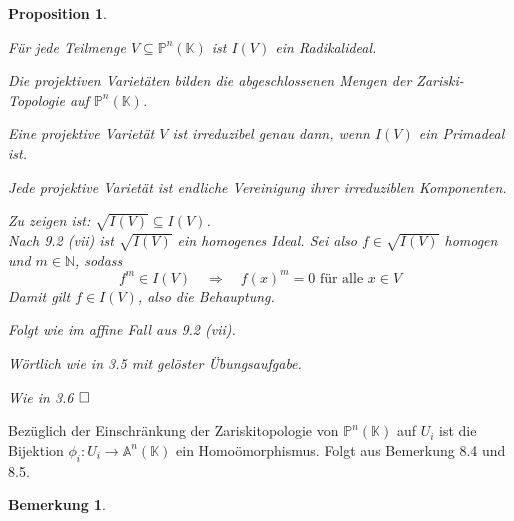 \documentclass[11pt]{book}
\newtheorem{prop}[theorem]{Proposition}
\newtheorem{remark}[theorem]{Bemerkung}
\theoremstyle{nonumberbreak}
\newenvironment{pr}[1][]{\ifthenelse{\equal{#1}{}}{\proof}{\proof[#1]}\rm}{\endproof}
\newenvironment{folg}[1][]{\ifthenelse{\equal{#1}{}}{\folger}{\folger[#1]}\rm}{\endfolger}
\begin{document}
\begin{spacing}{1.3}
\begin{prop} %
\begin{compactenum}
\item Für jede Teilmenge $V \subseteq \mathbb{P}^n(\mathbb{K})$ ist $I(V)$ ein Radikalideal.
\item Die projektiven Varietäten bilden die abgeschlossenen Mengen der \textit{Zariski-Topologie} auf $\mathbb{P}^n(\mathbb{K})$.
\item Eine projektive Varietät $V$ ist irreduzibel genau dann, wenn $I(V)$ ein Primadeal ist.
\item Jede projektive Varietät ist endliche Vereinigung ihrer irreduziblen Komponenten.
\end{compactenum}
\begin{pr}
\begin{compactenum}
\item Zu zeigen ist: $ \sqrt{I(V)} \subseteq I(V)$.\\
Nach 9.2 (vii) ist $\sqrt{I(V)}$ ein homogenes Ideal. Sei also $f \in \sqrt{I(V)}$ homogen und $m \in \mathbb{N}$, sodass
$$f^m \in I(V) \quad \Longrightarrow \quad f(x)^m = 0 \textrm{ für alle } x \in V$$
Damit gilt $f \in I(V)$, also die Behauptung.
\item Folgt wie im affine Fall aus 9.2 (vii).
\item Wörtlich wie in 3.5 mit gelöster Übungsaufgabe.
\item Wie in 3.6 $\hfill \Box$
\end{compactenum}
\end{pr}
\end{prop}

\begin{folg} %

Bezüglich der Einschränkung der Zariskitopologie von $\mathbb{P}^n(\mathbb{K})$ auf $U_i$ ist die Bijektion $\phi_i: U_i \longrightarrow \mathbb{A}^n(\mathbb{K})$ ein Homoömorphismus.
\begin{pr}
Folgt aus Bemerkung 8.4 und 8.5.
\end{pr}
\end{folg}

\begin{remark} %


\end{remark}
\end{spacing}
\end{document}
